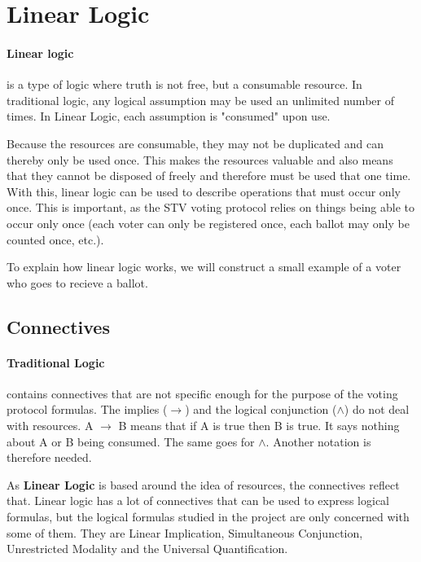 \section{Linear Logic}
\label{03_01}

\paragraph{Linear logic} is a type of logic where truth is not free, but a consumable resource. In traditional logic, any logical assumption may be used an unlimited number of times. In Linear Logic, each assumption is "consumed" upon use.

Because the resources are consumable, they may not be duplicated and can thereby only be used once. This makes the resources valuable and also means that they cannot be disposed of freely and therefore must be used that one time. With this, linear logic can be used to describe operations that must occur only once. This is important, as the STV voting protocol relies on things being able to occur only once (each voter can only be registered once, each ballot may only be counted once, etc.).

To explain how linear logic works, we will construct a small example of a voter who goes to recieve a ballot.

\subsection{Connectives}
\label{03_01_01}

\paragraph{Traditional Logic} contains connectives that are not specific enough for the purpose of the voting protocol formulas. The implies ($\rightarrow$) and the logical conjunction ($\wedge$) do not deal with resources. A $\rightarrow$ B means that if A is true then B is true. It says nothing about A or B being consumed. The same goes for $\wedge$. Another notation is therefore needed. 

As \textbf{Linear Logic} is based around the idea of resources, the connectives reflect that. Linear logic has a lot of connectives that can be used to express logical formulas, but the logical formulas studied in the project are only concerned with some of them. They are Linear Implication, Simultaneous Conjunction, Unrestricted Modality and the Universal Quantification.

